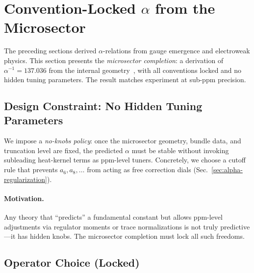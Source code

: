 
\section{Convention-Locked \texorpdfstring{$\alpha$}{α} from the Microsector}\label{sec:alpha-locked}

The preceding sections derived $\alpha$-relations from gauge emergence and electroweak physics. This section presents the \textit{microsector completion}: a derivation of $\alpha^{-1} = 137.036$ from the internal geometry~\cite{AlcockAbInitioAlpha2026}, with all conventions locked and no hidden tuning parameters. The result matches experiment at sub-ppm precision.

\subsection{Design Constraint: No Hidden Tuning Parameters}\label{sec:no-knobs-policy}

We impose a \emph{no-knobs policy}: once the microsector geometry, bundle data, and truncation level are fixed, the predicted $\alpha$ must be stable without invoking subleading heat-kernel terms as ppm-level tuners. Concretely, we choose a cutoff rule that prevents $a_6, a_8, \ldots$ from acting as free correction dials (Sec.~\ref{sec:alpha-regularization}).

\paragraph{Motivation.}
Any theory that ``predicts'' a fundamental constant but allows ppm-level adjustments via regulator moments or trace normalizations is not truly predictive---it has hidden knobs. The microsector completion must lock all such freedoms.

\subsection{Operator Choice (Locked)}\label{sec:alpha-operator-choice}

